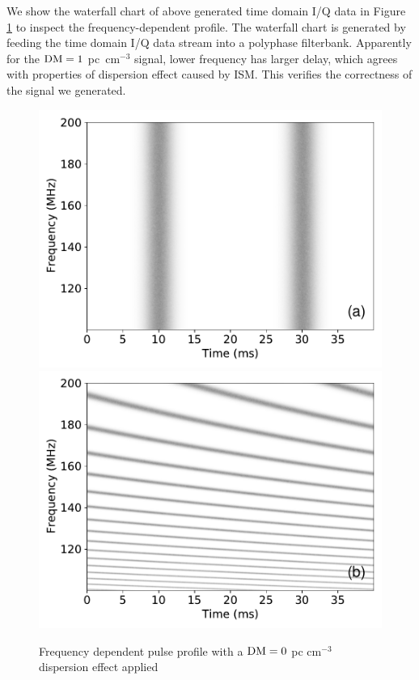\documentclass[fleqn,usenatbib]{mnras}
\begin{document}
We show the waterfall chart of above generated time domain I/Q data in Figure \ref{fig:fb} to inspect the frequency-dependent profile.
The waterfall chart is generated by feeding the time domain I/Q data stream into a polyphase filterbank.
Apparently for the ${\rm DM}=1$ pc~cm$^{-3}$ signal, lower frequency has larger delay, which agrees with properties of dispersion effect caused by ISM. 
This verifies the correctness of the signal we generated.

\begin{figure}
    \centering
    \includegraphics[width=0.9\columnwidth]{dm0_fb.pdf}
    \includegraphics[width=0.9\columnwidth]{dm1_fb.pdf}
    \caption{Frequency dependent pulse profile with a $\rm DM=0$ pc cm$^{-3}$ dispersion effect applied}
    \label{fig:fb}
\end{figure}
\end{document}
